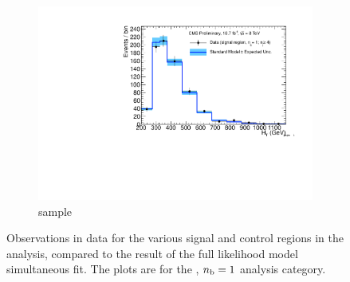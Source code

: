 \begin{figure}[h!]
\begin{subfigure}[b]{0.48\textwidth}
    \includegraphics[width=\textwidth,page=6]
    {Figs/results/v0/blueBand/bestFit_2012dev_RQcdZero_fZinvAll_1b_ge4j-12hp_smOnly}
    \caption{\gj sample}
  \end{subfigure}
  \caption{Observations in data for the various signal and control
  regions in the analysis, compared to the result of the full likelihood model
  simultaneous fit. The plots are for the \njhigh, $n_{\text{b}} = 1$ analysis category.}
  \label{fig:blue_fits_1b_ge4j}
\end{figure}

